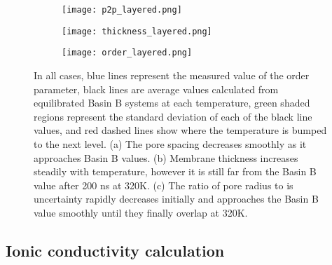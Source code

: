 \begin{figure}
	\centering
	\begin{subfigure}{0.325\textwidth}
		\centering
		\texttt{[image: p2p\_layered.png]}
		\caption{}\label{fig:p2p_layered}
	\end{subfigure}
	\begin{subfigure}{0.325\textwidth}
		\centering
		\texttt{[image: thickness\_layered.png]}
		\caption{}\label{fig:thickness_layered}
	\end{subfigure}
	\begin{subfigure}{0.325\textwidth}
		\centering
		\texttt{[image: order\_layered.png]}
		\caption{}\label{fig:order_layered}
	\end{subfigure}
	\caption{In all cases, blue lines represent the measured value of
	the order parameter, black lines are average values calculated from
	equilibrated Basin B systems at each temperature, green shaded regions
	represent the standard deviation of each of the black line values, and 
	red dashed lines show where the temperature is bumped to the next level.
	(a) The pore spacing decreases smoothly as it approaches Basin B values.
	(b) Membrane thickness increases steadily with temperature, however
	it is still far from the Basin B value after 200 ns at 320K. (c) The
	ratio of pore radius to is uncertainty rapidly decreases initially and
	approaches the Basin B value smoothly until they finally overlap at 320K.}\label{fig:phase_transition}
\end{figure}

\subsection*{Ionic conductivity calculation}

